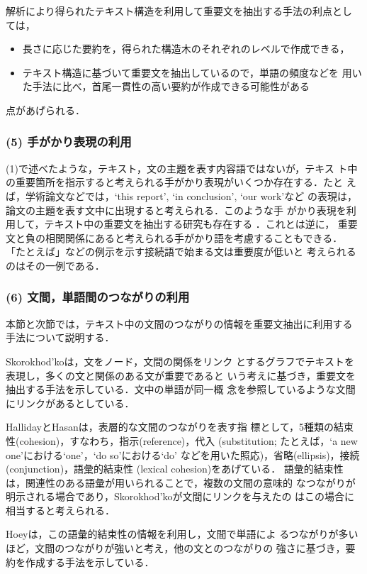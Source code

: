 解析により得られたテキスト構造を利用して重要文を抽出する手法の利点とし
ては，
\begin{itemize}
\item 長さに応じた要約を，得られた構造木のそれぞれのレベルで作成できる， 
\item テキスト構造に基づいて重要文を抽出しているので，単語の頻度などを
用いた手法に比べ，首尾一貫性の高い要約が作成できる可能性がある
\end{itemize}
点があげられる．

\subsubsection{(5) 手がかり表現の利用}

(1)で述べたような，テキスト，文の主題を表す内容語ではないが，テキス
ト中の重要箇所を指示すると考えられる手がかり表現がいくつか存在する．たと
えば，学術論文などでは，`this report', `in conclusion', `our work'など 
の表現は，論文の主題を表す文中に出現すると考えられる．このような手
がかり表現を利用して，テキスト中の重要文を抽出する研究も存在する
\cite{edmundson:69:a}．これとは逆に，
重要文と負の相関関係にあると考えられる手がかり語を考慮することもできる．
「たとえば」などの例示を示す接続語で始まる文は重要度が低いと
考えられるのはその一例である．

\subsubsection{(6) 文間，単語間のつながりの利用}

本節と次節では，テキスト中の文間のつながりの情報を重要文抽出に利用する
手法について説明する．

Skorokhod'ko\cite{skorokhodko:72:a}は，文をノード，文間の関係をリンク
とするグラフでテキストを表現し，多くの文と関係のある文が重要であると
いう考えに基づき，重要文を抽出する手法を示している．文中の単語が同一概
念を参照しているような文間にリンクがあるとしている．

HallidayとHasan\cite{halliday:76:a}は，表層的な文間のつながりを表す指
標として，5種類の結束性(cohesion)，すなわち，指示(reference)，代入
(substitution; たとえば，`a new one'における`one'，`do so'における`do'
などを用いた照応)，省略(ellipsis)，接続(conjunction)，語彙的結束性
(lexical cohesion)をあげている．
語彙的結束性は，関連性のある語彙が用いられることで，複数の文間の意味的
なつながりが明示される場合であり，Skorokhod'koが文間にリンクを与えたの
はこの場合に相当すると考えられる．

Hoey\cite{hoey:91:a}は，この語彙的結束性の情報を利用し，文間で単語によ 
るつながりが多いほど，文間のつながりが強いと考え，他の文とのつながりの
強さに基づき，要約を作成する手法を示している．

